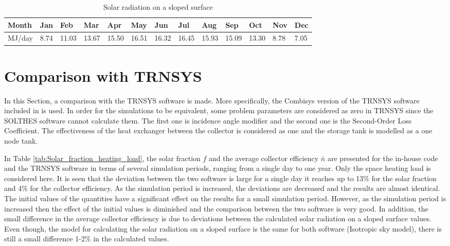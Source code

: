 \documentclass{article}
\begin{document}
\begin{table}
\caption{\label{tab:Solar_radiation} Solar radiation on a sloped surface}
\centering
\begin{tabular}{|l|l|l|l|l|l|l|l|l|l|l|l|l|}
\hline
Month & Jan & Feb & Mar & Apr & May & Jun & Jul & Aug & Sep & Oct & Nov & Dec \\\hline
MJ/day &  8.74 & 11.03 & 13.67 & 15.50 & 16.51 & 16.32 & 16.45 & 15.93 & 15.09 & 13.30 & 8.78 & 7.05 \\
\hline
\end{tabular}
\end{table}

\section{Comparison with TRNSYS}

In this Section, a comparison with the TRNSYS software is made. More specifically, the Combisys version of the TRNSYS software included in \cite{Beckman2021} is used. In order for the simulations to be equivalent, some problem parameters are considered as zero in TRNSYS since the SOLTHES software cannot calculate them. The first one is incidence angle modifier and the second one is the Second-Order Loss Coefficient. The effectiveness of the heat exchanger between the collector is considered as one and the storage tank is modelled as a one node tank.

In Table \ref{tab:Solar_fraction_heating_load}, the solar fraction $f$ and the average collector efficiency $\bar{n}$ are presented for the in-house code and the TRNSYS software in terms of several simulation periods, ranging from  a single day to one year. Only the space heating load is considered here. It is seen that the deviation between the two software is large for a single day it reaches up to 13\% for the solar fraction and 4\% for the collector efficiency. As the simulation period is increased, the deviations are decreased and the results are almost identical. The initial values of the quantities have a significant effect on the results for a small simulation period. However, as the simulation period is increased then the effect of the initial values is diminished and the comparison between the two software is very good. In addition, the small difference in the average collector efficiency is due to deviations between the calculated solar radiation on a sloped surface values. Even though, the model for calculating the solar radiation on a sloped surface is the same for both software (Isotropic sky model), there is still a small difference 1-2\% in the calculated values.   
\end{document}
